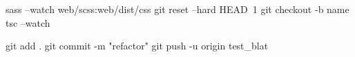 
sass --watch web/scss:web/dist/css
git reset --hard HEAD~1
git checkout -b name
tsc --watch

git add .   
git commit -m "refactor"  
git push -u origin test_blat 
